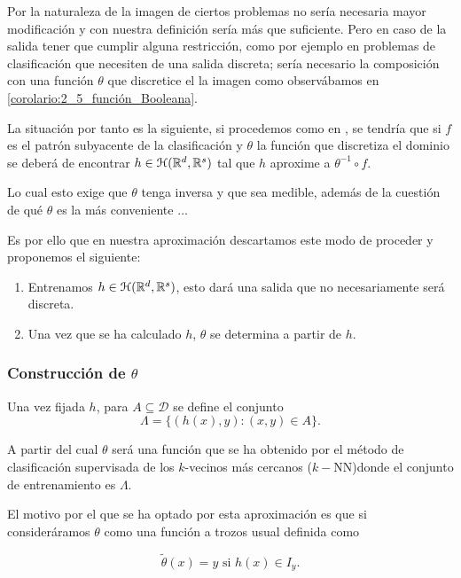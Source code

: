 Por la naturaleza de la imagen de ciertos problemas no sería 
necesaria mayor modificación y con nuestra definición sería 
más que suficiente. Pero en caso de la salida tener que cumplir alguna restricción, como por ejemplo en 
problemas de clasificación que necesiten de una salida discreta; sería necesario la composición con una función 
$\theta$ que discretice el la imagen como observábamos en \ref{corolario:2_5_función_Booleana}.  


La situación por tanto es la siguiente, si procedemos como en , se tendría que si $f$ es el patrón subyacente de la clasificación y $\theta$ la función que discretiza el dominio se deberá de encontrar 
$h \in \mathcal{H}(\mathbb{R}^d,\mathbb{R}^s)$ tal que $h$ aproxime a $\theta^{-1} \circ f$.

Lo cual esto exige que $\theta$ tenga inversa y que sea medible, además de la cuestión de qué $\theta$ es la más conveniente $\dots$

Es por ello que en nuestra aproximación descartamos este modo de proceder y proponemos el siguiente: 

\begin{enumerate}
    \item Entrenamos $h\in \mathcal{H}(\mathbb{R}^d,\mathbb{R}^s)$, esto dará una salida que no necesariamente será discreta. 
    \item Una vez que se ha calculado $h$,  $\theta$ se determina a partir de $h$. 
\end{enumerate}

\subsubsection*{Construcción de $\theta$}

Una vez fijada $h$,  para $A \subseteq \mathcal{D}$ se define  el conjunto 
\begin{equation}
    \Lambda = \{(h(x), y) : (x,y) \in A\}.
\end{equation}

A partir del cual $\theta$ será una función que se ha obtenido por el método de clasificación supervisada de los $k$-vecinos más cercanos ($k-$NN)donde el conjunto de entrenamiento es $\Lambda$.

El motivo por el que se ha optado por esta aproximación es que si consideráramos $\theta$ como una función a trozos usual definida como 

\begin{equation}
    \tilde{\theta}(x) = y \text{ si } h(x) \in I_y.
\end{equation}

